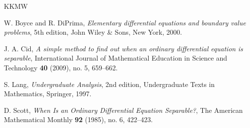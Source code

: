 \documentclass[12pt,reqno]{amsart}
\theoremstyle{plain}
\numberwithin{equation}{section} %
\numberwithin{table}{section} %
\numberwithin{figure}{section}
\begin{document}
\begin{thebibliography}{KKMW}



W. Boyce and R. DiPrima, \emph{Elementary differential equations and boundary value problems}, 5th edition, John Wiley \& Sons, New York, 2000.

J. A. Cid, \emph{A simple method to find out when an ordinary differential equation is separable}, International Journal of Mathematical Education in Science and Technology \textbf{40} (2009), no. 5, 659--662.

S. Lang, \emph{Undergraduate Analysis}, 2nd edition, Undergraduate Texts in Mathematics, Springer, 1997.

D. Scott, \emph{When Is an Ordinary Differential Equation Separable?}, The American Mathematical Monthly
\textbf{92} (1985), no. 6, 422--423.


\end{thebibliography}

\ \\
\end{document}
